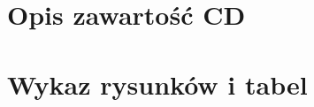 \documentclass[a4paper,12pt,twoside]{article}
\begin{document}
\newpage
\section*{Opis zawartość CD}


\newpage
\section*{Wykaz rysunków i tabel}
\listoffigures
\listoftables
\end{document}
